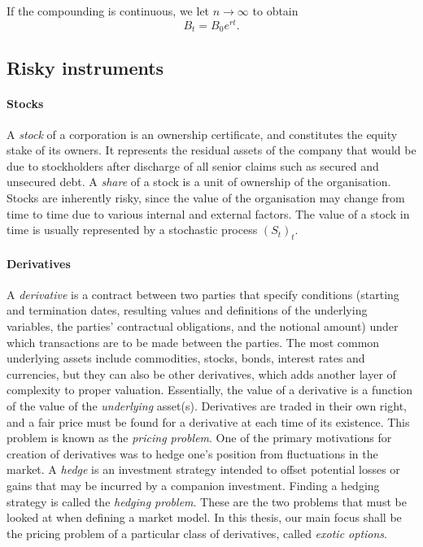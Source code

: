 If the compounding is continuous, we let $ n \to \infty $ to obtain
\begin{equation}
\label{eq:intro-compounding-continous}
B_t = B_0 e^{rt}.
\end{equation}



\subsection{Risky instruments}
\label{subsec:intro-assets-risky}


\paragraph{Stocks}
A \emph{stock} of a corporation is an ownership certificate, and constitutes the equity stake of its owners. It represents the residual assets of the company that would be due to stockholders after discharge of all senior claims such as secured and unsecured debt. A \emph{share} of a stock is a unit of ownership of the organisation. Stocks are inherently risky, since the value of the organisation may change from time to time due to various internal and external factors. The value of a stock in time is usually represented by a stochastic process $ (S_t)_t $.


\paragraph{Derivatives}
A \emph{derivative} is a contract between two parties that specify conditions (starting and termination dates, resulting values and definitions of the underlying variables, the parties' contractual obligations, and the notional amount) under which transactions are to be made between the parties. The most common underlying assets include commodities, stocks, bonds, interest rates and currencies, but they can also be other derivatives, which adds another layer of complexity to proper valuation. Essentially, the value of a derivative is a function of the value of the \emph{underlying} asset(s). Derivatives are traded in their own right, and a fair price must be found for a derivative at each time of its existence. This problem is known as the \emph{pricing problem}. One of the primary motivations for creation of derivatives was to hedge one's position from fluctuations in the market. A \emph{hedge} is an investment strategy intended to offset potential losses or gains that may be incurred by a companion investment. Finding a hedging strategy is called the \emph{hedging problem}. These are the two problems that must be looked at when defining a market model. In this thesis, our main focus shall be the pricing problem of a particular class of derivatives, called \emph{exotic options}.


